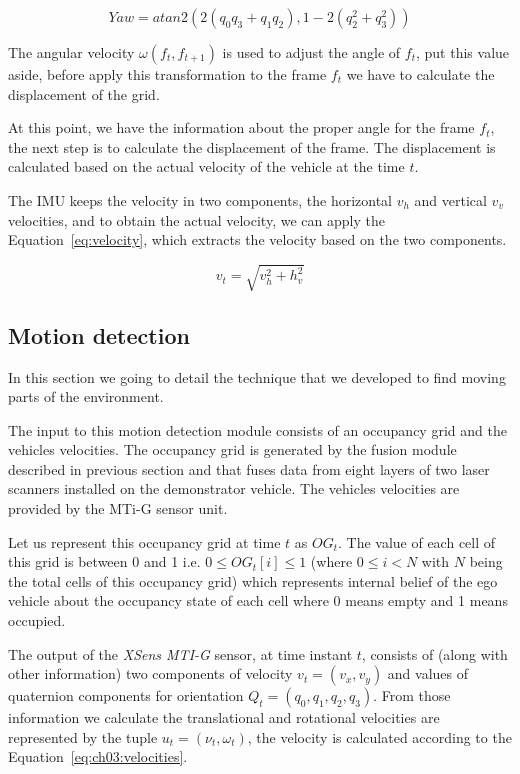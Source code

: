 \begin{equation}
\label{eq:quaternion}
Yaw=atan2(2(q_0 q_3+q_1 q_2),1-2(q_2^2+q_3^2))
\end{equation}

The angular velocity $\omega(f_t,f_{t+1})$ is used to adjust the angle of $f_t$, put this value aside, before apply this transformation to the frame $f_t$ we have to calculate the displacement of the grid.

At this point, we have the information about the proper angle for the frame $f_t$, the next step is to calculate the displacement of the frame. The displacement is calculated based on the actual velocity of the vehicle at the time $t$. 

The IMU keeps the velocity in two components, the horizontal $v_h$ and vertical $v_v$ velocities, and to obtain the actual velocity, we can apply the Equation~\ref{eq:velocity}, which extracts the velocity based on the two components.

\begin{equation}
\label{eq:velocity}
v_t=\sqrt{v_h^2+h_v^2}
\end{equation}

\subsection{Motion detection}
\label{ch03:motiondetection}

In this section we going to detail the technique that we developed to find moving parts of the environment. 

The input to this motion detection module consists of an occupancy grid and the vehicles velocities. The occupancy grid is generated by the fusion module described in previous section and that fuses data from eight layers of two laser scanners installed on the demonstrator vehicle. The vehicles velocities are provided by the MTi-G sensor unit.

Let us represent this occupancy grid at time $t$ as  $OG_t$. The value of each cell of this grid is between 0 and 1 i.e. $0 \leq OG_t[i] \leq 1$ (where $0 \leq i<N$ with $N$ being the total cells of this occupancy grid) which represents internal belief of the ego vehicle about the occupancy state of each cell where 0 means empty and 1 means occupied.


The output of the \textit{XSens MTI-G} sensor, at time instant $t$,
consists of (along with other information) two components of velocity $v_t=(v_x, v_y)$ and values of
quaternion components for orientation $Q_t=(q_0, q_1, q_2, q_3)$. From those information we calculate the
translational and rotational velocities are represented by the tuple $u_t=(\nu_t, \omega_t)$, the velocity is calculated according to the Equation~\ref{eq:ch03:velocities}.

